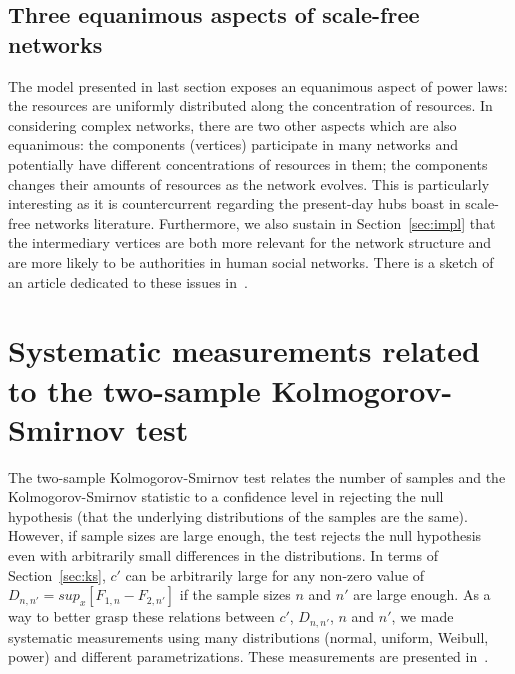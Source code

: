 \begin{apendicesenv}
\subsection{Three equanimous aspects of scale-free networks}
The model presented in last section exposes an equanimous aspect of power laws:
the resources are uniformly distributed along the concentration of resources.
In considering complex networks, there are two other aspects which are also equanimous:
the components (vertices) participate in many networks and potentially have different concentrations
of resources in them; the components changes their amounts of resources as the network evolves.
This is particularly interesting as it is countercurrent regarding the present-day hubs boast
in scale-free networks literature.
Furthermore, we also sustain in Section~\ref{sec:impl} that the intermediary vertices are both more relevant for the
network structure and are more likely to be authorities in human social networks.
There is a sketch of an article dedicated to these issues in~\cite{eqFree}.

\section{Systematic measurements related to the two-sample Kolmogorov-Smirnov test}
The two-sample Kolmogorov-Smirnov test relates the number of samples and the Kolmogorov-Smirnov statistic
to a confidence level in rejecting the null hypothesis (that the underlying distributions of the samples are the same).
However, if sample sizes are large enough, the test rejects the null hypothesis even with arbitrarily small differences
in the distributions.
In terms of Section~\ref{sec:ks}, $c'$ can be arbitrarily large for any non-zero value of
$D_{n,n'}=sup_x[F_{1,n}-F_{2,n'}]$
if the sample sizes $n$ and $n'$ are large enough.
As a way to better grasp these relations between 
$c'$,
$D_{n,n'}$,
$n$ and $n'$, we made systematic measurements using many distributions
(normal, uniform, Weibull, power) and different parametrizations.
These measurements are presented in~\cite{kolmSmir}.


\end{apendicesenv}
